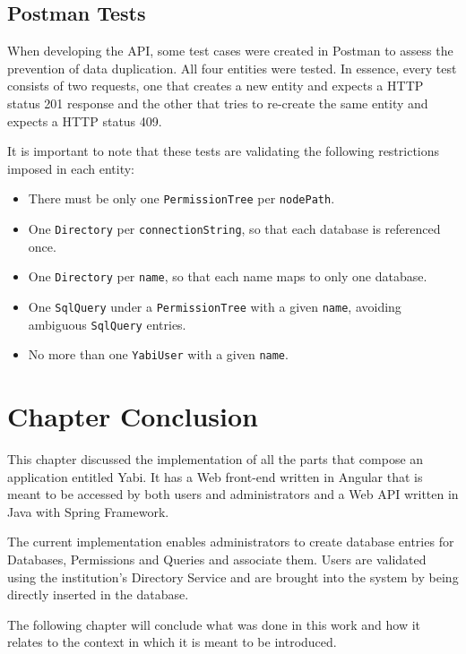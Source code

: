 \subsection{Postman Tests}\label{ptt}
When developing the \gls{API}, some test cases were created in Postman to assess the prevention of data duplication. All four entities were tested.
In essence, every test consists of two requests, one that creates a new entity and expects a \gls{HTTP} status 201 response and the other that tries to re-create the same entity and expects a \gls{HTTP} status 409.

It is important to note that these tests are validating the following restrictions imposed in each entity:
\begin{itemize}
\item There must be only one \texttt{PermissionTree} per \texttt{nodePath}.
\item One \texttt{Directory} per \texttt{connectionString}, so that each database is referenced once.
\item One \texttt{Directory} per \texttt{name}, so that each name maps to only one database.
\item One \texttt{SqlQuery} under a \texttt{PermissionTree} with a given \texttt{name}, avoiding ambiguous \texttt{SqlQuery} entries.
\item No more than one \texttt{YabiUser} with a given \texttt{name}.
\end{itemize}

\section{Chapter Conclusion}
This chapter discussed the implementation of all the parts that compose an application entitled \gls{Yabi}. It has a Web front-end written in Angular that is meant to be accessed by both users and administrators and a Web \gls{API} written in Java with Spring Framework.

The current implementation enables administrators to create database entries for Databases, Permissions and Queries and associate them. Users are validated using the institution's Directory Service and are brought into the system by being directly inserted in the database.

The following chapter will conclude what was done in this work and how it relates to the context in which it is meant to be introduced.